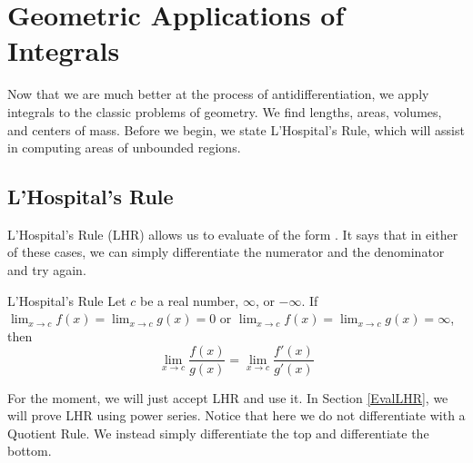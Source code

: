 \chapter{Geometric Applications of Integrals}
Now that we are much better at the process of antidifferentiation, we apply integrals to the classic problems of geometry.  We find lengths, areas, volumes, and centers of mass.  Before we begin, we state L'Hospital's Rule, which will assist in computing areas of unbounded regions.

\section{L'Hospital's Rule}\label{LHR}

L'Hospital's Rule (LHR) allows us to evaluate  of the form .  It says that in either of these cases, we can simply differentiate the numerator and the denominator and try again.  

\begin{theorem}{L'Hospital's Rule} Let $c$ be a real number, $\infty$, or $-\infty$.  If $\lim_{x \rightarrow c}f(x)=\lim_{x \rightarrow c}g(x)=0$ or  $\lim_{x \rightarrow c}f(x)=\lim_{x \rightarrow c}g(x)=\infty$, then 
 $$ \lim_{x \rightarrow c}\frac{f(x)}{g(x)}=\lim_{x \rightarrow c}\frac{f'(x)}{g'(x)}$$
\end{theorem}

For the moment, we will just accept LHR and use it.  In Section \ref{EvalLHR}, we will prove LHR using power series.  Notice that here we do not differentiate with a Quotient Rule.  We instead simply differentiate the top and differentiate the bottom.

